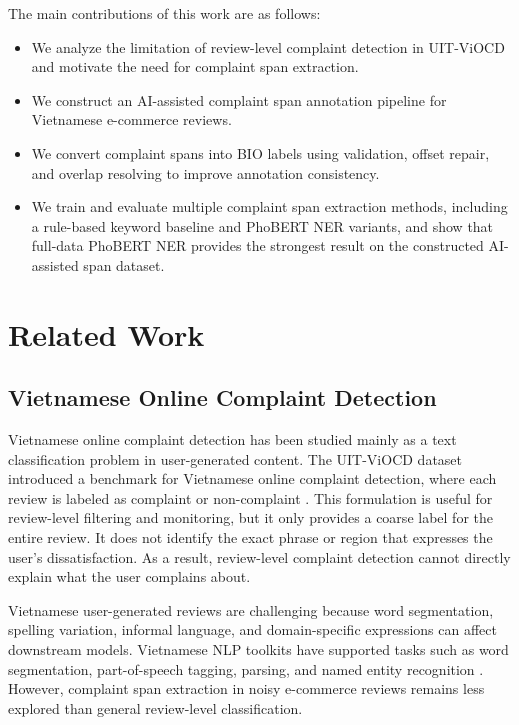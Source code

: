 \documentclass[11pt]{article}
\begin{document}
The main contributions of this work are as follows:
\begin{itemize}
    \item We analyze the limitation of review-level complaint detection in UIT-ViOCD and motivate the need for complaint span extraction.
    \item We construct an AI-assisted complaint span annotation pipeline for Vietnamese e-commerce reviews.
    \item We convert complaint spans into BIO labels using validation, offset repair, and overlap resolving to improve annotation consistency.
    \item We train and evaluate multiple complaint span extraction methods, including a rule-based keyword baseline and PhoBERT NER variants, and show that full-data PhoBERT NER provides the strongest result on the constructed AI-assisted span dataset.
\end{itemize}

\section{Related Work}

\subsection{Vietnamese Online Complaint Detection}

Vietnamese online complaint detection has been studied mainly as a text classification problem in user-generated content. The UIT-ViOCD dataset introduced a benchmark for Vietnamese online complaint detection, where each review is labeled as complaint or non-complaint \citep{viocd2021}. This formulation is useful for review-level filtering and monitoring, but it only provides a coarse label for the entire review. It does not identify the exact phrase or region that expresses the user's dissatisfaction. As a result, review-level complaint detection cannot directly explain what the user complains about.

Vietnamese user-generated reviews are challenging because word segmentation, spelling variation, informal language, and domain-specific expressions can affect downstream models. Vietnamese NLP toolkits have supported tasks such as word segmentation, part-of-speech tagging, parsing, and named entity recognition \citep{vncorenlp2018}. However, complaint span extraction in noisy e-commerce reviews remains less explored than general review-level classification.
\end{document}
